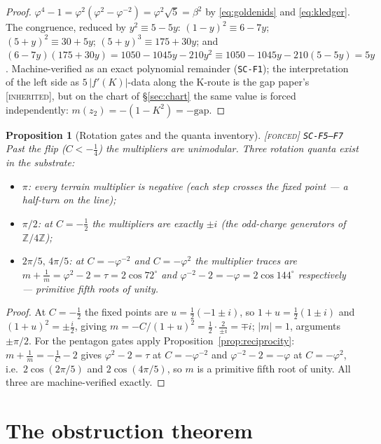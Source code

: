 \documentclass[11pt]{article}
\newcommand{\tagF}{\textcolor{cF}{\textsc{[forced]}}}
\newcommand{\tagI}{\textcolor{cI}{\textsc{[inherited]}}}
\newcommand{\hx}[1]{\textcolor{cC}{\footnotesize\texttt{#1}}}
\newcommand{\Z}{\mathbb{Z}}
\newcommand{\gp}{\varphi}
\newcommand{\gapc}{\mathrm{gap}}
\theoremstyle{plain}
\newtheorem{proposition}[theorem]{Proposition}
\theoremstyle{definition}
\theoremstyle{remark}
\begin{document}
\begin{proof}
$\gp^4-1=\gp^2(\gp^2-\gp^{-2})=\gp^2\sqrt5=\beta^2$ by \eqref{eq:goldenids} and
\eqref{eq:kledger}. The congruence, reduced by $y^2\equiv 5-5y$:
$(1-y)^2\equiv 6-7y$; $(5+y)^2\equiv 30+5y$; $(5+y)^3\equiv175+30y$; and
$(6-7y)(175+30y)=1050-1045y-210y^2\equiv1050-1045y-210(5-5y)=5y$. Machine-verified as
an exact polynomial remainder (\hx{SC-F1}); the interpretation of the left side as
$5\,|f'(K)|$-data along the K-route is the gap paper's \tagI{}, but on the chart of
\S\ref{sec:chart} the same value is forced independently: $m(z_2)=-(1-K^2)=-\gapc$.
\end{proof}

\begin{proposition}[Rotation gates and the quanta inventory]\label{prop:quanta}\tagF{} \hx{SC-F5--F7}
Past the flip ($C<-\tfrac14$) the multipliers are unimodular. Three rotation quanta
exist in the substrate:
\begin{itemize}[nosep]
\item $\pi$: every terrain multiplier is negative (each step crosses the fixed point
--- a half-turn on the line);
\item $\pi/2$: at $C=-\tfrac12$ the multipliers are exactly $\pm i$ (the odd-charge
generators of $\Z/4\Z$);
\item $2\pi/5,\,4\pi/5$: at $C=-\gp^{-2}$ and $C=-\gp^{2}$ the multiplier traces are
$m+\tfrac1m=\gp^2-2=\tau=2\cos72^\circ$ and $\gp^{-2}-2=-\gp=2\cos144^\circ$
respectively --- primitive fifth roots of unity.
\end{itemize}
\end{proposition}

\begin{proof}
At $C=-\tfrac12$ the fixed points are $u=\tfrac12(-1\pm i)$, so
$1+u=\tfrac12(1\pm i)$ and $(1+u)^2=\pm\tfrac i2$, giving
$m=-C/(1+u)^2=\tfrac12\cdot\tfrac{2}{\pm i}=\mp i$; $|m|=1$, arguments $\pm\pi/2$. For the pentagon gates apply
Proposition~\ref{prop:reciprocity}: $m+\tfrac1m=-\tfrac1C-2$ gives
$\gp^2-2=\tau$ at $C=-\gp^{-2}$ and $\gp^{-2}-2=-\gp$ at $C=-\gp^{2}$, i.e.\
$2\cos(2\pi/5)$ and $2\cos(4\pi/5)$, so $m$ is a primitive fifth root of unity. All
three are machine-verified exactly.
\end{proof}

\section{The obstruction theorem}\label{sec:obstruction}
\end{document}
